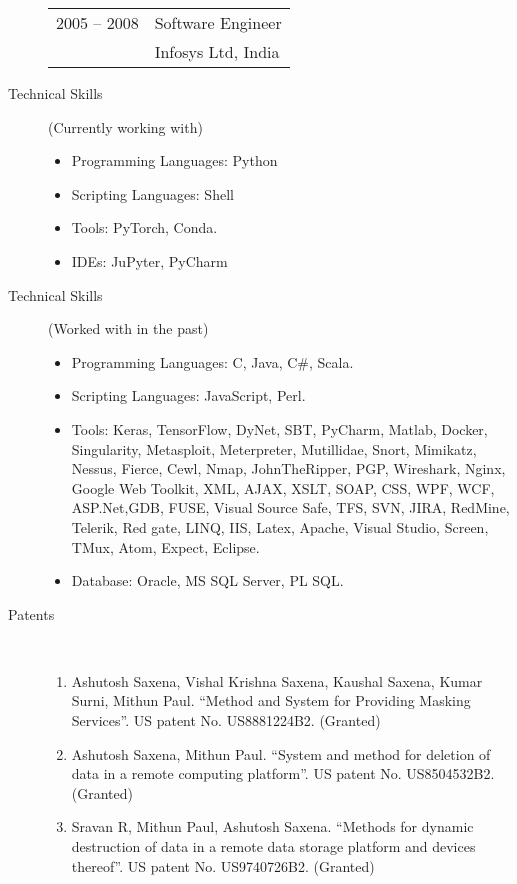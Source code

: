 \documentclass[10pt]{article}
\newcommand{\ti}[1]{``#1''} %
\begin{document}
\begin{description}
\begin{tabular}{lp{4.9in}}
\hspace{-.2cm}2005 -- 2008 & Software Engineer	\\
& {\sc Infosys Ltd, India} 

\end{tabular}




\item [Technical Skills](Currently working with) \
\begin{itemize}
\itemsep0em
\item Programming Languages:  Python
\item Scripting Languages: Shell
\item Tools:  PyTorch, Conda.
\item IDEs: JuPyter, PyCharm\\
\end{itemize}


\item [Technical Skills] (Worked with in the past) \
\begin{itemize}
\itemsep0em
\item Programming Languages:  C, Java, C\#, Scala.
\item Scripting Languages: JavaScript, Perl.
\item Tools: Keras, TensorFlow, DyNet, SBT, PyCharm, Matlab, Docker, Singularity, Metasploit, Meterpreter, Mutillidae, Snort, Mimikatz, Nessus, Fierce, Cewl, Nmap, JohnTheRipper, PGP, Wireshark, Nginx, Google Web Toolkit, XML, AJAX, XSLT, SOAP, CSS, WPF, WCF, ASP.Net,GDB, FUSE, Visual Source Safe, TFS, SVN, JIRA, RedMine, Telerik, Red gate, LINQ, IIS, Latex, Apache, Visual Studio, Screen, TMux, Atom, Expect, Eclipse.
\item Database: Oracle, MS SQL Server, PL SQL.\\
\end{itemize}



\item [Patents] \
\begin{enumerate}


\item 
Ashutosh Saxena, Vishal Krishna Saxena, Kaushal Saxena, Kumar Surni, Mithun Paul. \ti{Method and System for Providing Masking Services}.  US patent No. US8881224B2. (Granted)
\item 
Ashutosh Saxena, Mithun Paul. \ti{System and method for deletion of data in a remote computing platform}.  US patent No. US8504532B2. (Granted)
\item 
Sravan R, Mithun Paul, Ashutosh Saxena. \ti{Methods for dynamic destruction of data in a remote data storage platform and devices thereof}.  US patent No. US9740726B2. (Granted)


\end{enumerate}
\end{description}
\end{document}
